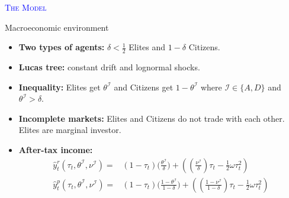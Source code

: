 

\begin{frame}[noframenumbering] 
	\begin{center}
		{ \Huge \textcolor{blue}{\scshape The Model \\
		}}
	\end{center}
\end{frame}



\begin{frame}{Macroeconomic environment}
	\begin{itemize}
		\item<1-> \textbf{Two types of agents:} $\delta<\frac{1}{2}$ Elites and $1-\delta$ Citizens.
		\vspace{.25cm}
		\item<2-> \textbf{Lucas tree:} constant drift and lognormal shocks.
		\vspace{.25cm}
		\item<3-> \textbf{Inequality:}  Elites get $\theta^\mathcal{I}$ and Citizens get $1-\theta^\mathcal{I}$ where $\mathcal{I}\in\{A,D\}$ and $\theta^\mathcal{I}>\delta$.
		\vspace{.25cm}
		\item<3-> \textbf{Incomplete markets:} Elites and Citizens do not trade with each other. Elites are marginal investor.
		\vspace{.25cm}
		\item<4-> \textbf{After-tax income:}
		\begin{align*}
			\hat{y}_{t}^{r} (\tau_{t},\theta^{\mathcal{I}},\nu^{\mathcal{I}}) = & (1-\tau_{t})\bigg(\frac{\theta^\mathcal{I}}{\delta}\bigg)+\left(\left(\frac{\nu^{\mathcal{I}}}{\delta}\right)\tau_{t}-\frac{1}{2}\omega\tau_t^2\right) \\
			\hat{y}_{t}^{p} (\tau_{t},\theta^{\mathcal{I}},\nu^{\mathcal{I}}) = & (1-\tau_{t})\bigg(\frac{1-\theta^\mathcal{I}}{1-\delta}\bigg)+\left(\left(\frac{1-\nu^{\mathcal{I}}}{1-\delta}\right)\tau_{t}-\frac{1}{2}\omega\tau_t^2\right)
		\end{align*}
	\end{itemize}
\end{frame}


